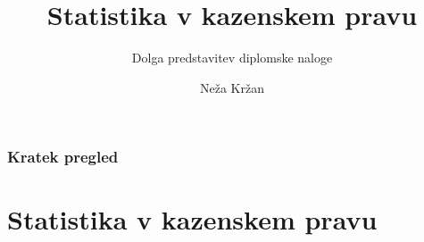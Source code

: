 \documentclass{beamer}
\begin{document}
\title{Statistika v kazenskem pravu}
\subtitle{Dolga predstavitev diplomske naloge}
\author[Neža Kržan]{Neža Kržan}
 
\date[5. maj 2023] {}

\subject{Talks}

\begin{frame}
   \titlepage
\end{frame}

\begin{frame}
   \frametitle{Kratek pregled}
   \tableofcontents[pausesections]
\end{frame}

\section{Statistika v kazenskem pravu}
\end{document}
